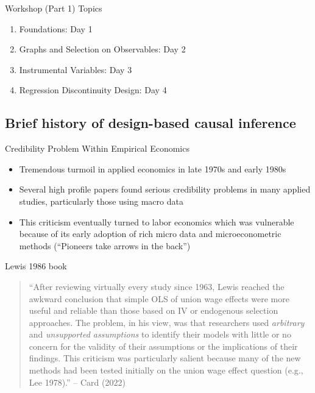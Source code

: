 \documentclass{beamer}
\begin{document}

\begin{frame}{Workshop (Part 1) Topics}

  \begin{enumerate}
    \item Foundations: Day 1
    \item Graphs and Selection on Observables: Day 2
    \item Instrumental Variables: Day 3
    \item Regression Discontinuity Design: Day 4
  \end{enumerate}

\end{frame}


\subsection{Brief history of design-based causal inference}



\begin{frame}{Credibility Problem Within Empirical Economics}

  \begin{itemize}
  \item Tremendous turmoil in applied economics in late 1970s and early 1980s
  \item Several high profile papers found serious credibility problems in many applied studies, particularly those using macro data
  \item This criticism eventually turned to labor economics which was vulnerable because of its early adoption of rich micro data and microeconometric methods (``Pioneers take arrows in the back'')
  \end{itemize}

\end{frame}



\begin{frame}{Lewis 1986 book}

\begin{quote}
``After reviewing virtually every study since 1963, Lewis reached the awkward conclusion that simple OLS of union wage effects were more useful and reliable than those based on IV or endogenous selection approaches. The problem, in his view, was that researchers used \emph{arbitrary} and \emph{unsupported assumptions} to identify their models with little or no concern for the validity of their assumptions or the implications of their findings. This criticism was particularly salient because many of the new methods had been tested initially on the union wage effect question (e.g., Lee 1978).'' -- Card (2022)
\end{quote}

\end{frame}
\end{document}
